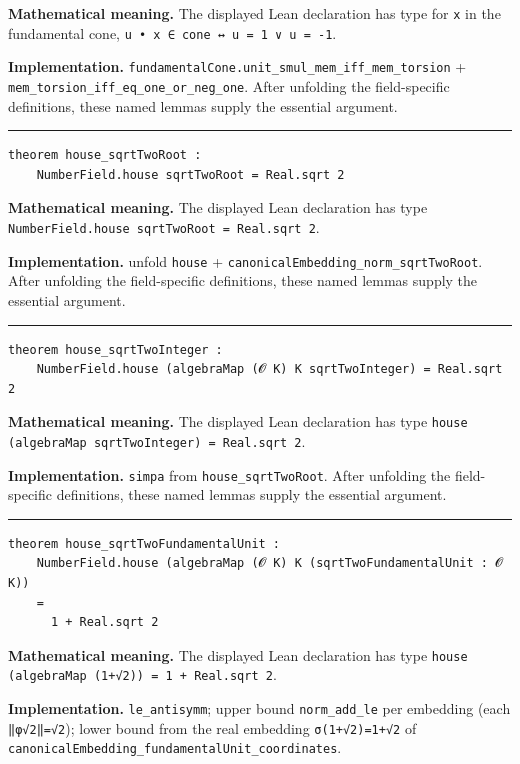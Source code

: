 \documentclass[UTF8,a4paper,11pt,fontset=fandol]{ctexart}
\theoremstyle{definition}
\newcommand{\statementsep}{\par\medskip\hrule\medskip}
\begin{document}
\noindent\textbf{Mathematical meaning.} The displayed Lean declaration has type for \texttt{x} in the fundamental cone, \texttt{u • x ∈ cone ↔ u = 1 ∨ u = -1}.\par
\noindent\textbf{Implementation.} \texttt{fundamentalCone.\allowbreak{}unit\_\allowbreak{}smul\_\allowbreak{}mem\_\allowbreak{}iff\_\allowbreak{}mem\_\allowbreak{}torsion} + \texttt{mem\_\allowbreak{}torsion\_\allowbreak{}iff\_\allowbreak{}eq\_\allowbreak{}one\_\allowbreak{}or\_\allowbreak{}neg\_\allowbreak{}one}. After unfolding the field-specific definitions, these named lemmas supply the essential argument.\par
\statementsep
\begin{verbatim}
theorem house_sqrtTwoRoot :
    NumberField.house sqrtTwoRoot = Real.sqrt 2
\end{verbatim}
\noindent\textbf{Mathematical meaning.} The displayed Lean declaration has type \texttt{NumberField.\allowbreak{}house sqrtTwoRoot = Real.\allowbreak{}sqrt 2}.\par
\noindent\textbf{Implementation.} unfold \texttt{house} + \texttt{canonicalEmbedding\_\allowbreak{}norm\_\allowbreak{}sqrtTwoRoot}. After unfolding the field-specific definitions, these named lemmas supply the essential argument.\par
\statementsep
\begin{verbatim}
theorem house_sqrtTwoInteger :
    NumberField.house (algebraMap (𝓞 K) K sqrtTwoInteger) = Real.sqrt 2
\end{verbatim}
\noindent\textbf{Mathematical meaning.} The displayed Lean declaration has type \texttt{house (algebraMap sqrtTwoInteger) = Real.\allowbreak{}sqrt 2}.\par
\noindent\textbf{Implementation.} \texttt{simpa} from \texttt{house\_\allowbreak{}sqrtTwoRoot}. After unfolding the field-specific definitions, these named lemmas supply the essential argument.\par
\statementsep
\begin{verbatim}
theorem house_sqrtTwoFundamentalUnit :
    NumberField.house (algebraMap (𝓞 K) K (sqrtTwoFundamentalUnit : 𝓞 K))
    =
      1 + Real.sqrt 2
\end{verbatim}
\noindent\textbf{Mathematical meaning.} The displayed Lean declaration has type \texttt{house (algebraMap (1+√2)) = 1 + Real.\allowbreak{}sqrt 2}.\par
\noindent\textbf{Implementation.} \texttt{le\_\allowbreak{}antisymm}; upper bound \texttt{norm\_\allowbreak{}add\_\allowbreak{}le} per embedding (each \texttt{‖φ√2‖=√2}); lower bound from the real embedding \texttt{σ(1+√2)=1+√2} of \texttt{canonicalEmbedding\_\allowbreak{}fundamentalUnit\_\allowbreak{}coordinates}.\par
\end{document}
